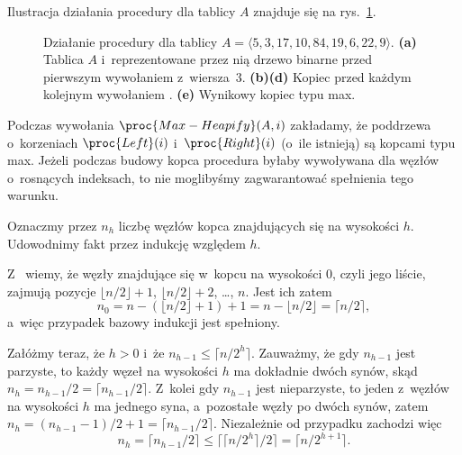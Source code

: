 
\exercise %
Ilustracja działania procedury  dla tablicy $A$ znajduje się na rys.\ \ref{fig:6.3-1}.
\begin{figure}[!ht]
	\centering 
	\caption{Działanie procedury  dla tablicy $A=\langle5,3,17,10,84,19,6,22,9\rangle$.
{\sffamily\bfseries(a)} Tablica $A$ i~reprezentowane przez nią drzewo binarne przed pierwszym wywołaniem  z~wiersza~3.
{\sffamily\bfseries(b)\nbendash(d)} Kopiec przed każdym kolejnym wywołaniem .
{\sffamily\bfseries(e)} Wynikowy kopiec typu max.} \label{fig:6.3-1}
\end{figure}

\exercise %
Podczas wywołania $\proc{Max-Heapify}(A,i)$ zakładamy, że poddrzewa o~korzeniach $\proc{Left}(i)$ i~$\proc{Right}(i)$ (o~ile istnieją) są kopcami typu max.
Jeżeli podczas budowy kopca procedura  byłaby wywoływana dla węzłów o~rosnących indeksach, to nie moglibyśmy zagwarantować spełnienia tego warunku.

\exercise %
Oznaczmy przez $n_h$ liczbę węzłów kopca znajdujących się na wysokości $h$.
Udowodnimy fakt przez indukcję względem $h$.

Z~ wiemy, że węzły znajdujące się w~kopcu na wysokości 0, czyli jego liście, zajmują pozycje $\lfloor n/2\rfloor+1$, $\lfloor n/2\rfloor+2$, \dots, $n$.
Jest ich zatem
\[
    n_0 = n-(\lfloor n/2\rfloor+1)+1 = n-\lfloor n/2\rfloor = \lceil n/2\rceil,
\]
a~więc przypadek bazowy indukcji jest spełniony.

Załóżmy teraz, że $h>0$ i~że $n_{h-1}\le\lceil n/2^h\rceil$.
Zauważmy, że gdy $n_{h-1}$ jest parzyste, to każdy węzeł na wysokości $h$ ma dokładnie dwóch synów, skąd $n_h=n_{h-1}/2=\lceil n_{h-1}/2\rceil$.
Z~kolei gdy $n_{h-1}$ jest nieparzyste, to jeden z~węzłów na wysokości $h$ ma jednego syna, a~pozostałe węzły po dwóch synów, zatem $n_h=(n_{h-1}-1)/2+1=\lceil n_{h-1}/2\rceil$.
Niezależnie od przypadku zachodzi więc
\[
    n_h = \lceil n_{h-1}/2\rceil \le \bigl\lceil\lceil n/2^h\rceil/2\bigr\rceil = \lceil n/2^{h+1}\rceil.
\]
